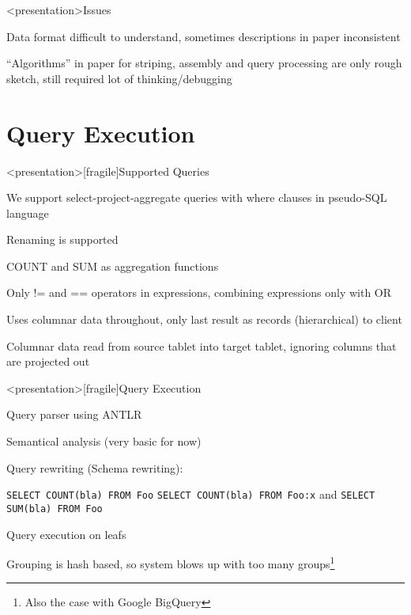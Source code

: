\begin{frame}<presentation>{Issues}
\begin{niitemize}
 \item Data format difficult to understand, sometimes descriptions
  in paper inconsistent
 \item ``Algorithms'' in paper for striping, assembly and query processing are only
  rough sketch, still required lot of
  thinking/debugging
\end{niitemize}
\end{frame}


\section{Query Execution}


\begin{frame}<presentation>[fragile]{Supported Queries}
\begin{niitemize}
  \item We support select-project-aggregate queries with where clauses in pseudo-SQL language
  \item Renaming is supported
  \item COUNT and SUM as aggregation functions
  \item Only != and == operators in expressions, combining expressions only with OR
  \item Uses columnar data throughout, only last result as
    records (hierarchical) to client
  \item Columnar data read from source tablet into target tablet, ignoring
    columns that are projected out
\end{niitemize}
\end{frame}

\begin{frame}<presentation>[fragile]{Query Execution}
\begin{niitemize}
 \item Query parser using ANTLR
 \item Semantical analysis (very basic for now)
 \item Query rewriting (Schema rewriting):
   \begin{niitemize}
     \item \verb#SELECT COUNT(bla) FROM Foo# \ra{} \verb#SELECT COUNT(bla) FROM Foo:x# and
       \verb#SELECT SUM(bla) FROM Foo#
   \end{niitemize}
 \item Query execution on leafs
 \item Grouping is hash based, so system blows up with too many groups\footnote{Also the case with Google BigQuery}
\end{niitemize}
\end{frame}

